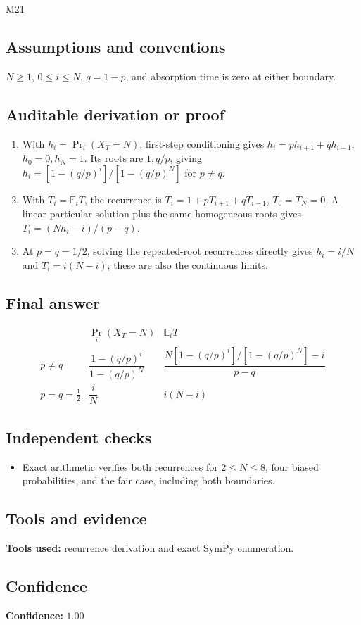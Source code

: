 \documentclass[11pt]{article}
\newcommand{\E}{\mathbb{E}}
\begin{document}

\begin{mprsolution}{M21}
\subsection*{Assumptions and conventions}
\(N\ge1\), \(0\le i\le N\), \(q=1-p\), and absorption time is zero at either
boundary.
\subsection*{Auditable derivation or proof}
\begin{enumerate}[label=\textbf{Step \arabic*:},leftmargin=*]
\item With \(h_i=\Pr_i(X_T=N)\), first-step conditioning gives
\(h_i=ph_{i+1}+qh_{i-1}\), \(h_0=0,h_N=1\).  Its roots are \(1,q/p\), giving
\(h_i=[1-(q/p)^i]/[1-(q/p)^N]\) for \(p\ne q\).
\item With \(T_i=\E_iT\), the recurrence is
\(T_i=1+pT_{i+1}+qT_{i-1}\), \(T_0=T_N=0\).  A linear particular solution plus
the same homogeneous roots gives \(T_i=(Nh_i-i)/(p-q)\).
\item At \(p=q=1/2\), solving the repeated-root recurrences directly gives
\(h_i=i/N\) and \(T_i=i(N-i)\); these are also the continuous limits.
\end{enumerate}
\subsection*{Final answer}
\[
\boxed{\begin{array}{c|cc}
&\Pr_i(X_T=N)&\E_iT\\ \hline
p\ne q&\dfrac{1-(q/p)^i}{1-(q/p)^N}&
\dfrac{N[1-(q/p)^i]/[1-(q/p)^N]-i}{p-q}\\[0.6em]
p=q=\tfrac12&\dfrac{i}{N}&i(N-i)
\end{array}}
\]
\subsection*{Independent checks}
\begin{itemize}[leftmargin=*]
\item Exact arithmetic verifies both recurrences for \(2\le N\le8\), four
biased probabilities, and the fair case, including both boundaries.
\end{itemize}
\subsection*{Tools and evidence}
\textbf{Tools used:} recurrence derivation and exact SymPy enumeration.
\subsection*{Confidence}
\textbf{Confidence:} \(1.00\)
\end{mprsolution}
\end{document}
